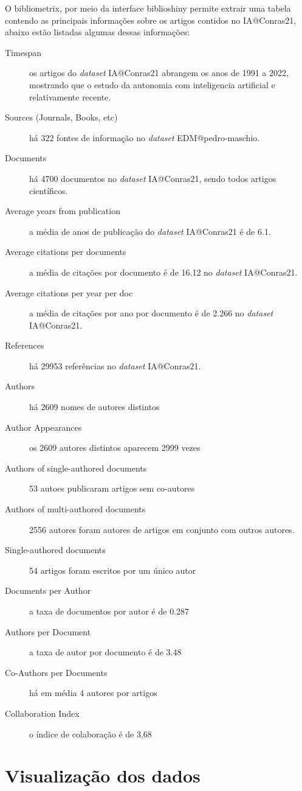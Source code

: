 O bibliometrix, por meio da interface biblioshiny permite extrair uma tabela contendo as principais informações sobre os artigos contidos no IA@Conras21, abaixo estão listadas algumas dessas informações:
\begin{description}
    \item[Timespan] os artigos do \textit{dataset} IA@Conras21 abrangem os anos de 1991 a 2022, mostrando que o estudo da autonomia com inteligencia artificial e relativamente recente.
    \item[Sources (Journals, Books, etc)] há 322 fontes de informação no \textit{dataset} EDM@pedro-maschio.
    \item[Documents] há 4700 documentos no \textit{dataset} IA@Conras21, sendo todos artigos científicos.
    \item[Average years from publication] a média de anos de publicação do \textit{dataset} IA@Conras21 é de 6.1.
    \item[Average citations per documents] a média de citações por documento é de 16.12 no \textit{dataset} IA@Conras21.
    \item[Average citations per year per doc] a média de citações por ano por documento é de 2.266 no \textit{dataset} IA@Conras21.
    \item[References] há 29953 referências no \textit{dataset} IA@Conras21.
    \item[Authors] há 2609 nomes de autores distintos
    \item[Author Appearances] os 2609 autores distintos aparecem 2999 vezes
    \item[Authors of single-authored documents] 53 autoes publicaram artigos sem co-autores
    \item[Authors of multi-authored documents] 2556 autores foram autores de artigos em conjunto com outros autores.
    \item[Single-authored documents] 54 artigos foram escritos por um único autor
    \item[Documents per Author] a taxa de documentos por autor é de 0.287
    \item[Authors per Document] a taxa de autor por documento é de 3.48
    \item[Co-Authors per Documents] há em média 4 autores por artigos
    \item[Collaboration Index] o índice de colaboração é de 3,68
\end{description}

\section{Visualização dos dados}

